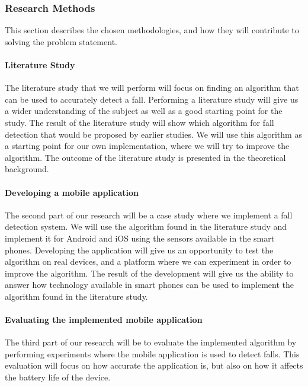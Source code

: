 \documentclass[12pt, a4paper, onecolumn]{article}
\begin{document}
	\subsubsection{Research Methods}
	
	This section describes the chosen methodologies, and how they will contribute to solving the problem statement.
	
	\paragraph{Literature Study}
	
	The literature study that we will perform will focus on finding an algorithm that can be used to accurately detect a fall. Performing a literature study will give us a wider understanding of the subject as well as a good starting point for the study. The result of the literature study will show which algorithm for fall detection that would be proposed by earlier studies. We will use this algorithm as a starting point for our own implementation, where we will try to improve the algorithm. The outcome of the literature study is presented in the theoretical background.
	
	\paragraph{Developing a mobile application}
	The second part of our research will be a case study where we implement a fall detection system. We will use the algorithm found in the literature study and implement it for Android and iOS using the sensors available in the smart phones. Developing the application will give us an opportunity to test the algorithm on real devices, and a platform where we can experiment in order to improve the algorithm. The result of the development will give us the ability to answer how technology available in smart phones can be used to implement the algorithm found in the literature study.
	
	\paragraph{Evaluating the implemented mobile application}
	
	The third part of our research will be to evaluate the implemented algorithm by performing experiments where the mobile application is used to detect falls. This evaluation will focus on how accurate the application is, but also on how it affects the battery life of the device.
	
\end{document}
